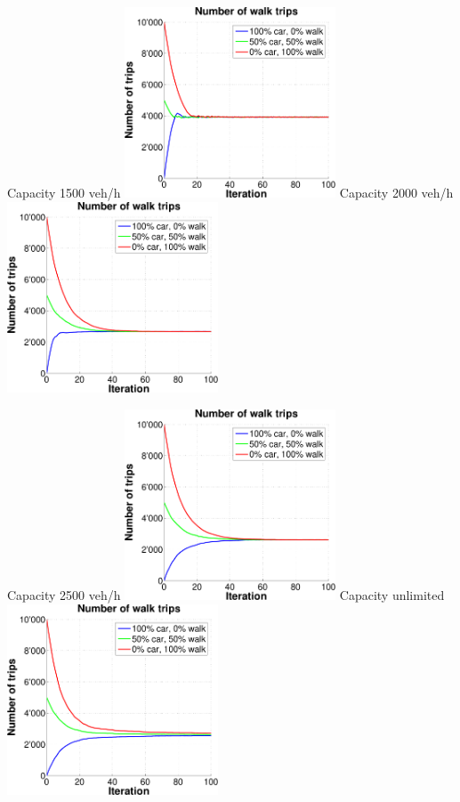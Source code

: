 {  \createsubfigure%
  {Capacity 1500 veh/h}%
  {\includegraphics[width=0.47\textwidth, angle=0, trim=0mm 0mm 0mm 9mm, clip=true]{extending/figures/MultiModalSimulation/simulations/num_walk_trips_1500}}%
  {\label{}}%
  {\hspace{3mm}}%
  \createsubfigure%
  {Capacity 2000 veh/h}%
  {\includegraphics[width=0.47\textwidth, angle=0, trim=0mm 0mm 0mm 9mm, clip=true]{extending/figures/MultiModalSimulation/simulations/num_walk_trips_2000}}%
  {\label{}}%
  {\vspace{7.5mm}}%

  \createsubfigure%
  {Capacity 2500 veh/h}%
  {\includegraphics[width=0.47\textwidth, angle=0, trim=0mm 0mm 0mm 9mm, clip=true]{extending/figures/MultiModalSimulation/simulations/num_walk_trips_2500}}%
  {\label{}}%
  {\hspace{3mm}}%
  \createsubfigure%
  {Capacity unlimited}%
  {\includegraphics[width=0.47\textwidth, angle=0, trim=0mm 0mm 0mm 9mm, clip=true]{extending/figures/MultiModalSimulation/simulations/num_walk_trips_unlimited}}%
  {\label{}}%
  {}%
}%
